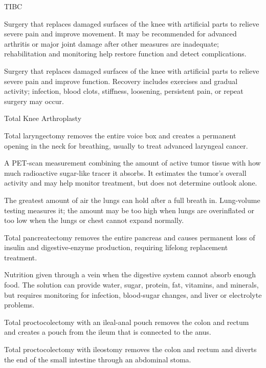 \synonyms
TIBC

 Surgery that replaces damaged surfaces of the knee with artificial parts to relieve severe pain and improve movement. It may be recommended for advanced arthritis or major joint damage after other measures are inadequate; rehabilitation and monitoring help restore function and detect complications.

 Surgery that replaces damaged surfaces of the knee with artificial parts to relieve severe pain and improve function. Recovery includes exercises and gradual activity; infection, blood clots, stiffness, loosening, persistent pain, or repeat surgery may occur.

\synonyms
Total Knee Arthroplasty

 Total laryngectomy removes the entire voice box and creates a permanent opening in the neck for breathing, usually to treat advanced laryngeal cancer.

 A PET-scan measurement combining the amount of active tumor tissue with how much radioactive sugar-like tracer it absorbs. It estimates the tumor’s overall activity and may help monitor treatment, but does not determine outlook alone.

 The greatest amount of air the lungs can hold after a full breath in. Lung-volume testing measures it; the amount may be too high when lungs are overinflated or too low when the lungs or chest cannot expand normally.

 Total pancreatectomy removes the entire pancreas and causes permanent loss of insulin and digestive-enzyme production, requiring lifelong replacement treatment.

 Nutrition given through a vein when the digestive system cannot absorb enough food. The solution can provide water, sugar, protein, fat, vitamins, and minerals, but requires monitoring for infection, blood-sugar changes, and liver or electrolyte problems.

 Total proctocolectomy with an ileal-anal pouch removes the colon and rectum and creates a pouch from the ileum that is connected to the anus.

 Total proctocolectomy with ileostomy removes the colon and rectum and diverts the end of the small intestine through an abdominal stoma.

